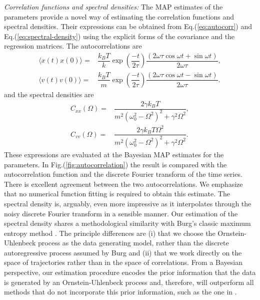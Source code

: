 \documentclass[english,aps, twocolumn, pre,superscriptaddress, notitlepage]{revtex4-1}
\begin{document}
\emph{Correlation functions and spectral densities: }The MAP estimates
of the parameters provide a novel way of estimating the correlation
functions and spectral densities. Their expressions can be obtained
from Eq.(\ref{eq:autocorr}) and Eq.(\ref{eq:spectral-density}) using
the explicit forms of the covariance and the regression matrices.
The autocorrelations are 
\begin{align*}
\langle x\left(t\right)x\left(0\right)\rangle= & \dfrac{k_{B}T}{k}\exp\left(\dfrac{-t}{2\tau}\right)\dfrac{(2\omega\tau\cos\omega t+\sin\omega t)}{2\omega\tau},\\
\langle v\left(t\right)v\left(0\right)\rangle= & \dfrac{k_{B}T}{m}\exp\left(\dfrac{-t}{2\tau}\right)\dfrac{(2\omega\tau\cos\omega t-\sin\omega t)}{2\omega\tau}.
\end{align*}
and the spectral densities are
\begin{align*}
C_{xx}(\Omega)= & \dfrac{2\gamma k_{B}T}{m^{2}(\omega_{0}^{2}-\Omega^{2})^{2}+\gamma^{2}\Omega^{2}},\\
C_{vv}(\Omega)= & \dfrac{2\gamma k_{B}T\Omega^{2}}{m^{2}(\omega_{0}^{2}-\Omega^{2})^{2}+\gamma^{2}\Omega^{2}}.
\end{align*}
These expressions are evaluated at the Bayesian MAP estimates for
the parameters. In Fig.(\ref{fig:autocorrelation}) the result is
compared with the autocorrelation function and the discrete Fourier
transform of the time series. There is excellent agreement between
the two autocorrelations. We emphasize that no numerical function
fitting is required to obtain this estimate. The spectral density
is, arguably, even more impressive as it interpolates through the
noisy discrete Fourier transform in a sensible manner. Our estimation
of the spectral density shares a methodological similarity with Burg's
classic maximum entropy method \cite{burg1967maximum}. The principle
differences are (i) that we choose the Ornstein-Uhlenbeck process
as the data generating model, rather than the discrete autoregressive
process assumed by Burg and (ii) that we work directly on the space
of trajectories rather than in the space of correlations. From a Bayesian
perspective, our estimation procedure encodes the prior information
that the data is generated by an Ornstein-Uhlenbeck process and, therefore,
will outperform all methods \cite{berg2004power,tassieri2012microrheology}
that do not incorporate this prior information, such as the one in
\cite{Bera:16}.
\end{document}
